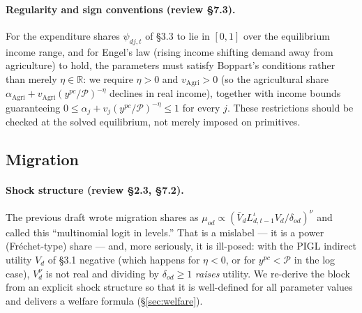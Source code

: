 \documentclass[11pt]{article}
\begin{document}
\paragraph{Regularity and sign conventions (review \S7.3).} For the expenditure shares
$\psi_{dj,t}$ of \S3.3 to lie in $[0,1]$ over the equilibrium income range, and for
Engel's law (rising income shifting demand away from agriculture) to hold, the parameters
must satisfy Boppart's conditions rather than merely $\eta\in\mathbb{R}$: we require
$\eta>0$ and $v_{\mathrm{Agri}}>0$ (so the agricultural share $\alpha_{\mathrm{Agri}} +
v_{\mathrm{Agri}}(y^{pc}/\mathcal{P})^{-\eta}$ declines in real income), together with
income bounds guaranteeing $0\le \alpha_j + v_j (y^{pc}/\mathcal{P})^{-\eta}\le 1$ for
every $j$. These restrictions should be checked at the solved equilibrium, not merely
imposed on primitives.

\subsection{Migration}\label{sec:migration}
\paragraph{Shock structure (review \S2.3, \S7.2).} The previous draft wrote migration
shares as $\mu_{od}\propto(\bar V_d L_{d,t-1}^{\iota} V_d/\delta_{od})^{\nu}$ and called
this ``multinomial logit in levels.'' That is a mislabel --- it is a power (Fr\'echet-type)
share --- and, more seriously, it is ill-posed: with the PIGL indirect utility $V_d$ of
\S3.1 negative (which happens for $\eta<0$, or for $y^{pc}<\mathcal{P}$ in the log case),
$V_d^{\nu}$ is not real and dividing by $\delta_{od}\ge 1$ \emph{raises} utility. We
re-derive the block from an explicit shock structure so that it is well-defined for all
parameter values and delivers a welfare formula (\S\ref{sec:welfare}).
\end{document}
